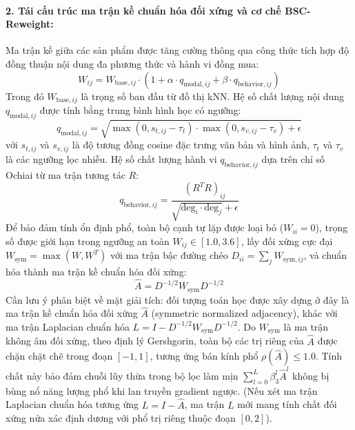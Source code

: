 \paragraph{2. Tái cấu trúc ma trận kề chuẩn hóa đối xứng và cơ chế BSC-Reweight:}
Ma trận kề giữa các sản phẩm được tăng cường thông qua công thức tích hợp độ đồng thuận nội dung đa phương thức và hành vi đồng mua:
\begin{equation}
W_{ij} = W_{\text{base}, ij} \cdot \left(1 + \alpha \cdot q_{\text{modal}, ij} + \beta \cdot q_{\text{behavior}, ij}\right)
\end{equation}
Trong đó $W_{\text{base}, ij}$ là trọng số ban đầu từ đồ thị kNN. Hệ số chất lượng nội dung $q_{\text{modal}, ij}$ được tính bằng trung bình hình học có ngưỡng:
\begin{equation}
q_{\text{modal}, ij} = \sqrt{\max(0, s_{t, ij} - \tau_t) \cdot \max(0, s_{v, ij} - \tau_v) + \epsilon}
\end{equation}
với $s_{t, ij}$ và $s_{v, ij}$ là độ tương đồng cosine đặc trưng văn bản và hình ảnh, $\tau_t$ và $\tau_v$ là các ngưỡng lọc nhiễu. Hệ số chất lượng hành vi $q_{\text{behavior}, ij}$ dựa trên chỉ số Ochiai từ ma trận tương tác $R$:
\begin{equation}
q_{\text{behavior}, ij} = \frac{(R^T R)_{ij}}{\sqrt{\text{deg}_i \cdot \text{deg}_j} + \epsilon}
\end{equation}
Để bảo đảm tính ổn định phổ, toàn bộ cạnh tự lặp được loại bỏ ($W_{ii} = 0$), trọng số được giới hạn trong ngưỡng an toàn $W_{ij} \in [1.0, 3.6]$, lấy đối xứng cực đại $W_{\text{sym}} = \max(W, W^T)$ với ma trận bậc đường chéo $D_{ii} = \sum_j W_{\text{sym}, ij}$, và chuẩn hóa thành ma trận kề chuẩn hóa đối xứng:
\begin{equation}
\hat{A} = D^{-1/2} W_{\text{sym}} D^{-1/2}
\end{equation}
Cần lưu ý phân biệt về mặt giải tích: đối tượng toán học được xây dựng ở đây là ma trận kề chuẩn hóa đối xứng $\hat{A}$ (symmetric normalized adjacency), khác với ma trận Laplacian chuẩn hóa $L = I - D^{-1/2} W_{\text{sym}} D^{-1/2}$. Do $W_{\text{sym}}$ là ma trận không âm đối xứng, theo định lý Gershgorin, toàn bộ các trị riêng của $\hat{A}$ được chặn chặt chẽ trong đoạn $[-1, 1]$, tương ứng bán kính phổ $\rho(\hat{A}) \le 1.0$. Tính chất này bảo đảm chuỗi lũy thừa trong bộ lọc làm mịn $\sum_{l=0}^{L} \beta_3^l \hat{A}^l$ không bị bùng nổ năng lượng phổ khi lan truyền gradient ngược. (Nếu xét ma trận Laplacian chuẩn hóa tương ứng $L = I - \hat{A}$, ma trận $L$ mới mang tính chất đối xứng nửa xác định dương với phổ trị riêng thuộc đoạn $[0, 2]$).

